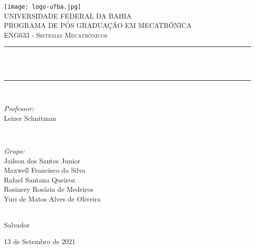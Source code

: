 \begin{titlepage}
	\centering
	\texttt{[image: logo-ufba.jpg]}\\[0.5 cm]	%
	\textsc{\LARGE UNIVERSIDADE FEDERAL DA BAHIA}\\[0.5 cm]	%
	\textsc{\large PROGRAMA DE PÓS GRADUAÇÃO EM MECATRÔNICA}\\[1 cm]
	\textsc{\Large ENG633 - Sistemas Mecatrônicos}\\[0.5 cm]				%
	\rule{\linewidth}{0.2 mm} \\
	{ \huge \bfseries \thetitle}\\
	\rule{\linewidth}{0.2 mm} \\[1 cm]
	
	\begin{minipage}{0.5\textwidth}
		\begin{flushleft} \large
			\emph{Professor:}\\
			Leizer Schnitman\\
		\end{flushleft}
	\end{minipage}~
	\begin{minipage}{0.5\textwidth}
		
		\begin{flushright} \large
			\emph{Grupo:} \\
			Jailson dos Santos Junior\\
			Maxwell Francisco da Silva\\
			Rafael Santana Queiroz\\
			Rosinery Rosária de Medeiros\\
			Yuri de Matos Alves de Oliveira
		\end{flushright}
		
	\end{minipage}\\[1.0 cm]
	
	
	Salvador
	
	13 de Setembro de 2021
	
	
	
	
\end{titlepage}